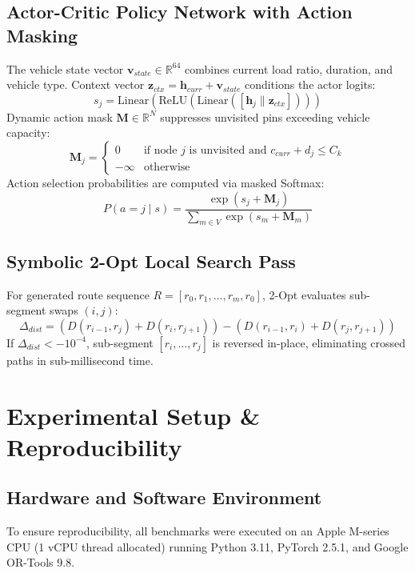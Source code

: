 \documentclass[10pt,journal,compsoc]{IEEEtran}
\begin{document}
\subsection{Actor-Critic Policy Network with Action Masking}
The vehicle state vector $\mathbf{v}_{state} \in \mathbb{R}^{64}$ combines current load ratio, duration, and vehicle type. Context vector $\mathbf{z}_{ctx} = \mathbf{h}_{curr} + \mathbf{v}_{state}$ conditions the actor logits:
\begin{equation}
s_j = \text{Linear} \left( \text{ReLU} \left( \text{Linear} ( [\mathbf{h}_j \parallel \mathbf{z}_{ctx}] ) \right) \right)
\end{equation}
Dynamic action mask $\mathbf{M} \in \mathbb{R}^N$ suppresses unvisited pins exceeding vehicle capacity:
\begin{equation}
\mathbf{M}_j = \begin{cases} 
0 & \text{if node } j \text{ is unvisited and } c_{curr} + d_j \le C_k \\
-\infty & \text{otherwise}
\end{cases}
\end{equation}
Action selection probabilities are computed via masked Softmax:
\begin{equation}
P(a = j \mid s) = \frac{\exp(s_j + \mathbf{M}_j)}{\sum_{m \in V} \exp(s_m + \mathbf{M}_m)}
\end{equation}

\subsection{Symbolic 2-Opt Local Search Pass}
For generated route sequence $R = [r_0, r_1, \dots, r_m, r_0]$, 2-Opt evaluates sub-segment swaps $(i, j)$:
\begin{equation}
\Delta_{dist} = (D(r_{i-1}, r_j) + D(r_i, r_{j+1})) - (D(r_{i-1}, r_i) + D(r_j, r_{j+1}))
\end{equation}
If $\Delta_{dist} < -10^{-4}$, sub-segment $[r_i, \dots, r_j]$ is reversed in-place, eliminating crossed paths in sub-millisecond time.

\section{Experimental Setup \& Reproducibility}

\subsection{Hardware and Software Environment}
To ensure reproducibility, all benchmarks were executed on an Apple M-series CPU (1 vCPU thread allocated) running Python 3.11, PyTorch 2.5.1, and Google OR-Tools 9.8.
\end{document}
